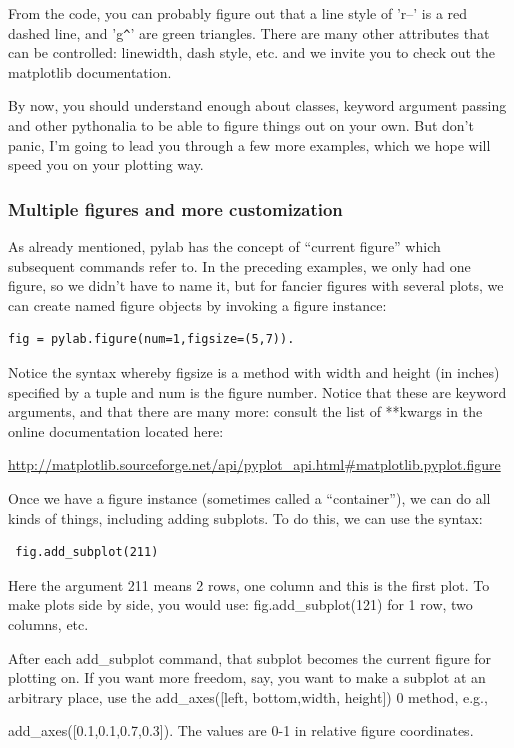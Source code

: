 \documentclass[11pt]{book}
\begin{document}
{{{{\noindent   From the code, you can probably figure out that a line style of 'r--' is a red dashed line,  and 'g\verb|^|'  are green triangles.
There are many other attributes that can be controlled: linewidth, dash style, etc. and we invite you to check out the {\color{blue}matplotlib} documentation.

\noindent By now, you should understand enough about classes, keyword argument passing and other pythonalia to be able to figure things out on your own.   But don't panic, I'm going to lead you through a few more examples, which we hope will speed you on your plotting way.

\subsubsection{Multiple figures and more customization}
As already mentioned,  {\color{blue}pylab} has the concept of ``current figure'' which subsequent commands refer to.   In the preceding examples, we only had one figure, so we didn't have to name it, but for fancier figures with several plots, we
can create  named figure objects by invoking a {\color{blue}figure} instance:

 {\color{blue}\begin{verbatim}
fig = pylab.figure(num=1,figsize=(5,7)).
\end{verbatim}}

\noindent  Notice the syntax whereby {\color{blue} figsize}  is a method with  width and height (in inches) specified by a tuple and {\color{blue}num}  is the figure number.    Notice that these are keyword arguments, and that there are many more:  consult the list of  **kwargs in the online documentation  located here:

\url{http://matplotlib.sourceforge.net/api/pyplot_api.html#matplotlib.pyplot.figure }

Once we have a figure instance (sometimes called a ``container''), we can do all kinds of things, including adding subplots.  To do this, we can use the syntax:

{\color{blue}\begin{verbatim}
 fig.add_subplot(211)
 \end{verbatim}}
 \noindent Here the
argument  211 means 2 rows, one column and this is the first plot.  To make plots side by side, you would use: {\color{blue} fig.add\_subplot(121) } for  1 row, two columns, etc.

After each {\color{blue}add\_subplot} command, that subplot becomes the current figure for plotting on.
If you want more freedom, say, you want to make a subplot at an arbitrary place,  use the {\color{blue}add\_axes([left, bottom,width, height])} 0 method, e.g.,  {{\color{blue}add\_axes([0.1,0.1,0.7,0.3])}.  The values are 0-1 in relative figure coordinates.

}}}}}
\end{document}

